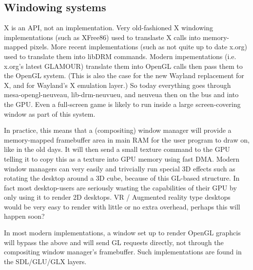 \documentclass[oneside,english]{scrbook}
\begin{document}
\subsection{Windowing systems}
X is an API, not an implementation.  Very old-fashioned X windowing implementations (such as XFree86) used to translaste X calls into memory-mapped pixels.  More recent implementations (such as not quite up to date x.org) used to translate them into libDRM commands.   Modern impementations (i.e. x.org's latest GLAMOUR) translate them into OpenGL calls then pass them to the OpenGL system. (This is also the case for the new Wayland replacement for X, and for Wayland's X emulation layer.)  So today everything goes through mesa-opengl-neuveau, lib-drm-neuvueu, and neuveua then on the bus and into the GPU.  Even a full-screen game is likely to run inside a large screen-covering window as part of this system.

In practice, this means that a (compositing) window manager will provide a memory-mapped framebuffer area in main RAM for the user program to draw on, like in the old days.   It will then send a small texture command to the GPU telling it to copy this as a texture into GPU memory using fast DMA.  Modern window managers can very easily and trivcially run special 3D effects such as rotating the desktop around a 3D cube, because of this GL-based structure.  In fact most desktop-users are seriously wasting the capabilities of their GPU by only using it to render 2D desktops. VR / Augmented reality type desktops would be very easy to render with little or no extra overhead, perhaps this will happen soon?

In most modern implementations, a window set up to render OpenGL graphcis will bypass the above and will send GL requests directly, not through the compositing window manager's framebuffer.  Such implementations are found in the SDL/GLU/GLX layers.
\end{document}
